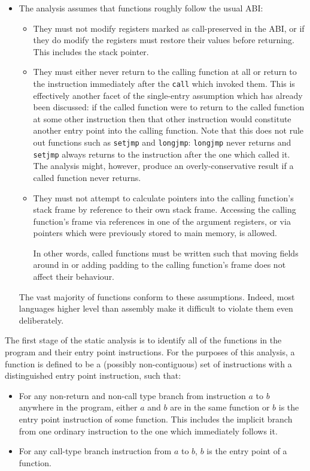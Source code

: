 \begin{itemize}
\item
  The analysis assumes that functions roughly follow the usual ABI:

  \begin{itemize}
  \item They must not modify registers marked as call-preserved in the
    ABI, or if they do modify the registers must restore their values
    before returning.  This includes the stack pointer.
  \item They must either never return to the calling function at all
    or return to the instruction immediately after the \verb|call|
    which invoked them.  This is effectively another facet of the
    single-entry assumption which has already been discussed: if the
    called function were to return to the called function at some
    other instruction then that other instruction would constitute
    another entry point into the calling function.  Note that this
    does not rule out functions such as \verb|setjmp| and
    \verb|longjmp|: \verb|longjmp| never returns and
    \verb|setjmp| always returns to the instruction after the one
    which called it.  The analysis might, however, produce an
    overly-conservative result if a called function never returns.
  \item They must not attempt to calculate pointers into the calling
    function's stack frame by reference to their own stack frame.
    Accessing the calling function's frame via references in one of
    the argument registers, or via pointers which were previously
    stored to main memory, is allowed.

    In other words, called functions must be written such that moving
    fields around in or adding padding to the calling function's frame
    does not affect their behaviour.
  \end{itemize}

  The vast majority of functions conform to these assumptions.
  Indeed, most languages higher level than assembly make it difficult
  to violate them even deliberately.
\end{itemize}

The first stage of the static analysis is to identify all of the
functions in the program and their entry point instructions.  For the
purposes of this analysis, a function is defined to be a (possibly
non-contiguous) set of instructions with a distinguished entry point
instruction, such that:

\begin{itemize}
\item
  For any non-return and non-call type branch from instruction $a$ to
  $b$ anywhere in the program, either $a$ and $b$ are in the same
  function or $b$ is the entry point instruction of some function.
  This includes the implicit branch from one ordinary instruction to
  the one which immediately follows it.
\item
  For any call-type branch instruction from $a$ to $b$, $b$ is the
  entry point of a function.
\end{itemize}

